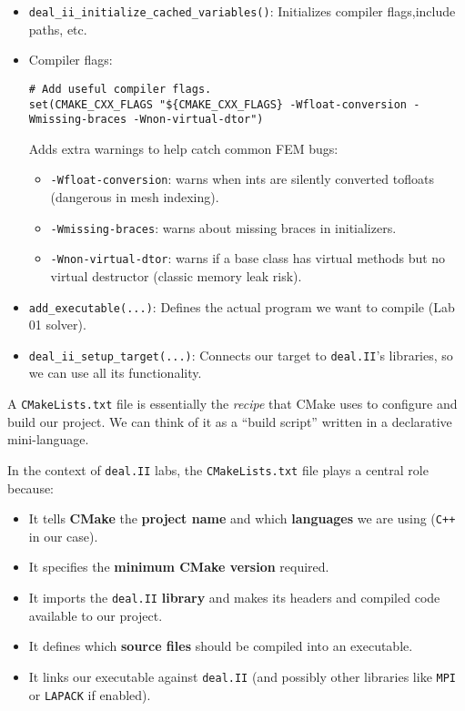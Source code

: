 \begin{itemize}
    
    \item \texttt{deal\_ii\_initialize\_cached\_variables()}: Initializes compiler flags,\break include paths, etc.
    

    \item Compiler flags:
    \begin{lstlisting}
# Add useful compiler flags.
set(CMAKE_CXX_FLAGS "${CMAKE_CXX_FLAGS} -Wfloat-conversion -Wmissing-braces -Wnon-virtual-dtor")\end{lstlisting}
    Adds extra warnings to help catch common FEM bugs:
    \begin{itemize}
        \item \texttt{-Wfloat-conversion}: warns when ints are silently converted to\break floats (dangerous in mesh indexing).
        \item \texttt{-Wmissing-braces}: warns about missing braces in initializers.
        \item \texttt{-Wnon-virtual-dtor}: warns if a base class has virtual methods but no virtual destructor (classic memory leak risk).
    \end{itemize}
    
    
    \item \texttt{add\_executable(...)}: Defines the actual program we want to compile (Lab 01 solver).
    
    
    \item \texttt{deal\_ii\_setup\_target(...)}: Connects our target to \texttt{deal.II}'s libraries, so we can use all its functionality.
\end{itemize}

\begin{remarkbox}
    A \texttt{CMakeLists.txt} file is essentially the \emph{recipe} that CMake uses to configure and build our project. We can think of it as a ``build script'' written in a declarative mini-language.

    \highspace
    In the context of \texttt{deal.II} labs, the \texttt{CMakeLists.txt} file plays a central role because:
    \begin{itemize}
        \item It tells \textbf{CMake} the \textbf{project name} and which \textbf{languages} we are using (\texttt{C++} in our case).
        \item It specifies the \textbf{minimum CMake version} required.
        \item It imports the \texttt{deal.II} \textbf{library} and makes its headers and compiled code available to our project.
        \item It defines which \textbf{source files} should be compiled into an executable.
        \item It links our executable against \texttt{deal.II} (and possibly other libraries like \texttt{MPI} or \texttt{LAPACK} if enabled).
    \end{itemize}
\end{remarkbox}